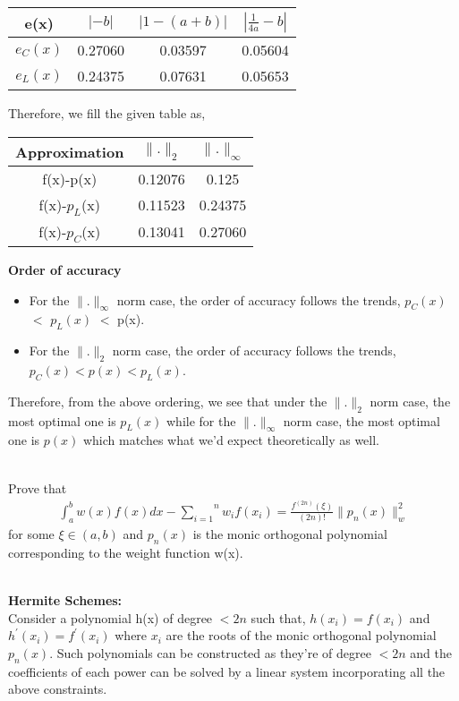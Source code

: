 \documentclass[letterpaper]{exam}
\begin{document}
\begin{questions}
\begin{parts}
\begin{solution}
\begin{center}
\begin{tabular}{|c|c|c|c|}
         \hline
          e(x)&$\left|-b\right|$&$\left|1-(a+b)\right|$&$\left|\frac{1}{4a} - b\right|$  \\
          \hline 
          $e_C(x)$&0.27060& 0.03597&0.05604\\
          \hline
          $e_L(x)$&0.24375&0.07631&0.05653\\
          \hline
     \end{tabular}
 \end{center}
 Therefore, we fill the given table as,
 \begin{center}
    \begin{tabular}{|c|c|c|}
  \hline
       Approximation& $\|.\|_{2}$&$\|.\|_{\infty}$  \\
 \hline
 f(x)-p(x) &0.12076 &0.125 \\
 \hline
 f(x)-$p_{L}$(x) &0.11523 & 0.24375 \\
 \hline
 f(x)-$p_{C}$(x) & 0.13041&0.27060 \\
 \hline
  \end{tabular} 
 \end{center}
 \textbf{Order of accuracy}
 \begin{itemize}
     \item For the $\|.\|_\infty$ norm case, the order of accuracy follows the trends, $p_C(x)$ $<$ $p_L(x)$ $<$ p(x).
     \item For the $\|.\|_2$ norm case, the order of accuracy follows the trends, $p_C(x) < p(x) < p_L(x)$.
 \end{itemize}
 Therefore, from the above ordering, we see that under the $\|.\|_2$ norm case, the most optimal one is $p_L(x)$ while for the $\|.\|_\infty$ norm case, the most optimal one is $p(x)$ which matches what we'd expect theoretically as well.
 \end{solution}
\end{parts}
\\
Prove that
\begin{align*}
    \int_{a}^{b} w(x)f(x) dx - \overset{n}{\underset{i=1}{\sum}} w_if(x_i) = \frac{f^{(2n)}(\xi)}{(2n)!} \|p_n(x)\|_{w}^2
\end{align*}
for some $\xi \in (a,b)$ and $p_n(x)$ is the monic orthogonal polynomial corresponding to the weight function w(x).
\begin{solution}
\\
\textbf{Hermite Schemes:}\\
Consider a polynomial h(x) of degree $< 2n$ such that,
$h(x_i) = f(x_i)$ and $h^{'}(x_i) = f^{'}(x_i)$ where $x_i$ are the roots of the monic orthogonal polynomial $p_n(x)$. Such polynomials can be constructed as they're of degree $< 2n$ and the coefficients of each power can be solved by a linear system incorporating all the above constraints.\\

\end{solution}
\end{questions}
\end{document}

